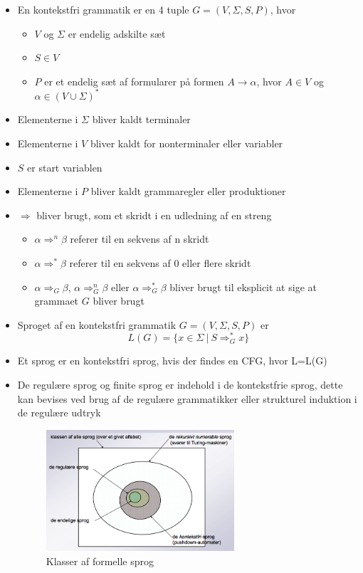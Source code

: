 \documentclass[a4, danish]{article}
\begin{document}
\begin{itemize}
	\item En kontekstfri grammatik er en 4 tuple $G=(V,\Sigma,S,P)$, hvor
  \begin{itemize}
  	\item $V$ og $\Sigma$ er endelig adskilte sæt
    \item $S \in V$
    \item $P$ er et endelig sæt af formularer på formen $A \rightarrow \alpha$, hvor $A \in V$ og $\alpha \in (V \cup \Sigma)^*$
  \end{itemize}
  \item Elementerne i $\Sigma$ bliver kaldt terminaler 
  \item Elementerne i $V$ bliver kaldt for nonterminaler eller variabler
  \item $S$ er start variablen 
  \item Elementerne i $P$ bliver kaldt grammaregler eller produktioner
  \item $\Rightarrow$ bliver brugt, som et skridt i en udledning af en streng
  \begin{itemize}
  	\item $\alpha \Rightarrow^n \beta $ referer til en sekvens af n skridt
    \item $\alpha \Rightarrow^* \beta $ referer til en sekvens af 0 eller flere skridt
    \item $\alpha \Rightarrow_G \beta$,  $\alpha \Rightarrow^n_G \beta$ eller  $\alpha \Rightarrow^*_G \beta$ bliver brugt til eksplicit at sige at grammaet $G$ bliver brugt 
  \end{itemize}
  \item Sproget af en kontekstfri grammatik $G=(V,\Sigma,S,P)$ er 
  \begin{equation*}
    L(G) = \{ x \in \Sigma \ | \ S \Rightarrow^*_G x\}
  \end{equation*}
  \item Et sprog er en kontekstfri sprog, hvis der findes en CFG, hvor L=L(G)
  \item De regulære sprog og finite sprog er indehold i de kontekstfrie sprog, dette kan bevises ved brug af de regulære grammatikker eller strukturel induktion i de regulære udtryk
    \begin{figure}[ht!]
	  \centering
	  \includegraphics[width=70mm]{img/sprogklasser.png}
	  \caption{Klasser af formelle sprog	\label{formelleSprog}}
  \end{figure} 

\end{itemize}
\end{document}
